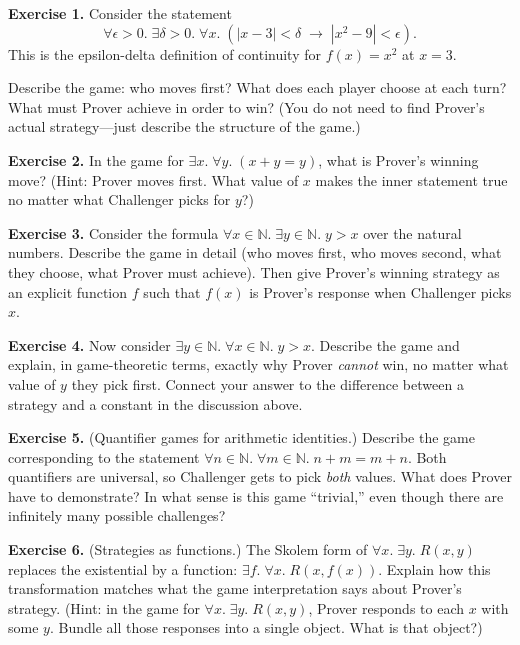 \documentclass[11pt]{article}
\begin{document}
\bigskip
\textbf{Exercise 1.} \label{ex:games:1} Consider the statement
\[
\forall \epsilon > 0.\; \exists \delta > 0.\; \forall x.\; (|x - 3| < \delta \;\to\; |x^2 - 9| < \epsilon).
\]
This is the epsilon-delta definition of continuity for $f(x) = x^2$ at $x = 3$.

Describe the game: who moves first? What does each player choose at each turn? What must Prover achieve in order to win? (You do not need to find Prover's actual strategy---just describe the structure of the game.)

\bigskip
\textbf{Exercise 2.} \label{ex:games:2} In the game for $\exists x.\; \forall y.\; (x + y = y)$, what is Prover's winning move? (Hint: Prover moves first. What value of $x$ makes the inner statement true no matter what Challenger picks for $y$?)

\bigskip
\textbf{Exercise 3.} \label{ex:games:3} Consider the formula $\forall x \in \mathbb{N}.\; \exists y \in \mathbb{N}.\; y > x$ over the natural numbers. Describe the game in detail (who moves first, who moves second, what they choose, what Prover must achieve). Then give Prover's winning strategy as an explicit function $f$ such that $f(x)$ is Prover's response when Challenger picks $x$.

\bigskip
\textbf{Exercise 4.} \label{ex:games:4} Now consider $\exists y \in \mathbb{N}.\; \forall x \in \mathbb{N}.\; y > x$. Describe the game and explain, in game-theoretic terms, exactly why Prover \emph{cannot} win, no matter what value of $y$ they pick first. Connect your answer to the difference between a strategy and a constant in the discussion above.

\bigskip
\textbf{Exercise 5.} \label{ex:games:5} (Quantifier games for arithmetic identities.) Describe the game corresponding to the statement $\forall n \in \mathbb{N}.\; \forall m \in \mathbb{N}.\; n + m = m + n$. Both quantifiers are universal, so Challenger gets to pick \emph{both} values. What does Prover have to demonstrate? In what sense is this game ``trivial,'' even though there are infinitely many possible challenges?

\bigskip
\textbf{Exercise 6.} \label{ex:games:6} (Strategies as functions.) The Skolem form of $\forall x.\; \exists y.\; R(x, y)$ replaces the existential by a function: $\exists f.\; \forall x.\; R(x, f(x))$. Explain how this transformation matches what the game interpretation says about Prover's strategy. (Hint: in the game for $\forall x.\; \exists y.\; R(x, y)$, Prover responds to each $x$ with some $y$. Bundle all those responses into a single object. What is that object?)
\end{document}
